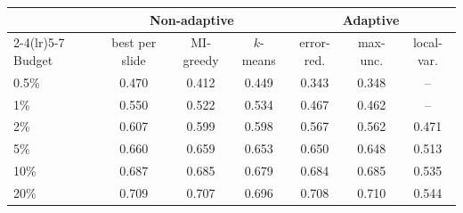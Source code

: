 \begin{tabular}{lcccccc}
\toprule
 & \multicolumn{3}{c}{Non-adaptive} & \multicolumn{3}{c}{Adaptive} \\
\cmidrule(lr){2-4}\cmidrule(lr){5-7}
Budget & best per slide & MI-greedy & $k$-means & error-red. & max-unc. & local-var. \\
\midrule
0.5\% & 0.470 & 0.412 & 0.449 & 0.343 & 0.348 & -- \\
1\% & 0.550 & 0.522 & 0.534 & 0.467 & 0.462 & -- \\
2\% & 0.607 & 0.599 & 0.598 & 0.567 & 0.562 & 0.471 \\
5\% & 0.660 & 0.659 & 0.653 & 0.650 & 0.648 & 0.513 \\
10\% & 0.687 & 0.685 & 0.679 & 0.684 & 0.685 & 0.535 \\
20\% & 0.709 & 0.707 & 0.696 & 0.708 & 0.710 & 0.544 \\
\bottomrule
\end{tabular}